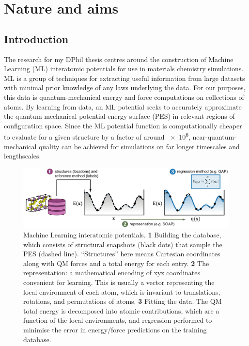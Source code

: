 \documentclass[12pt,a4paper,twoside,nobind]{ociamthesis}
\begin{document}
\chapter{Nature and aims} \label{chap:introduction}
%

\section{Introduction}
The research for my DPhil thesis centres around the construction of Machine Learning (ML) interatomic potentials
for use in materials chemistry simulations. ML is a group of techniques for extracting useful information from large datasets
with minimal prior knowledge of any laws underlying the data. 
For our purposes, this data is quantum-mechanical energy and force computations on collections of atoms.
By learning from data, 
an ML potential seeks to accurately approximate the quantum-mechanical potential energy surface (PES) in relevant regions of configuration space.
Since the ML potential function is computationally cheaper to evaluate for a given structure by a factor of around \num{e6},
 near-quantum-mechanical quality can be achieved for simulations on far longer timescales and lengthscales.

 \begin{figure}[ht]
  \includegraphics[width=\linewidth]{ML_schematic.pdf}
  \caption{
  Machine Learning interatomic potentials. \textbf{1} Building the database, which consists of structural snapshots (black dots) that sample the PES (dashed line). 
  ``Structures'' here means Cartesian coordinates along with QM forces and a total energy for each entry.
   \textbf{2} The representation: a mathematical encoding of xyz coordinates convenient for learning. This is usually a vector representing the local environment of each atom,
   which is invariant to translations, rotations, and permutations of atoms.
    \textbf{3} Fitting the data. The QM total energy is decomposed into atomic contributions, which are a function of the local environments, and regression performed to minimise the
    error in energy/force predictions on the training database. 
  }
  \label{fig:ML}
\end{figure}
\end{document}
